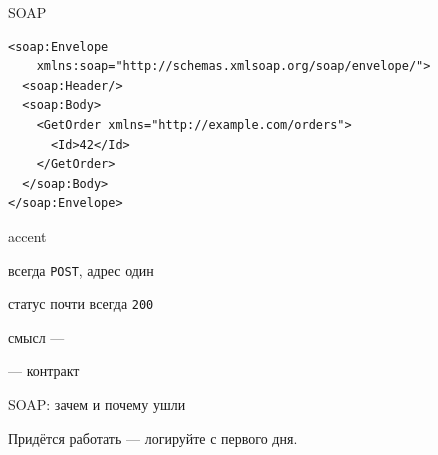 \documentclass[aspectratio=169,10pt,t]{beamer}
\newcommand{\codexs}{\ttfamily\fontsize{7.0}{8.3}\selectfont}
\begin{document}
\begin{frame}[fragile]{SOAP}
  \slidetop
  \begin{minipage}[t]{0.64\textwidth}
\begin{lstlisting}[style=xml,basicstyle=\codexs]
<soap:Envelope
    xmlns:soap="http://schemas.xmlsoap.org/soap/envelope/">
  <soap:Header/>
  <soap:Body>
    <GetOrder xmlns="http://example.com/orders">
      <Id>42</Id>
    </GetOrder>
  </soap:Body>
</soap:Envelope>
\end{lstlisting}
  \end{minipage}\hfill
  \begin{minipage}[t]{0.32\textwidth}
    \par\vspace{0.6em}
    \small
    \begin{cbul}{accent}
      \item всегда \texttt{POST}, адрес один
      \item статус почти всегда \texttt{200}
      \item смысл --- 
      \item {} --- контракт
    \end{cbul}
  \end{minipage}

  \slidegap
\end{frame}

\begin{frame}{SOAP: зачем и почему ушли}
  \slidetop

  \slidegap
  {\large Придётся работать --- логируйте  с первого дня.}

  \vspace{0.6em}
\end{frame}
\end{document}
